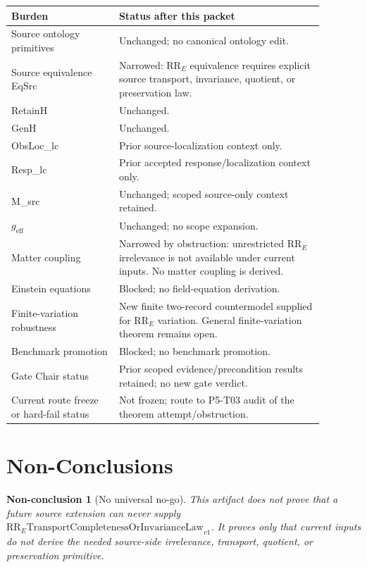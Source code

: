\documentclass[11pt]{article}
\newcommand{\RRE}{\mathrm{RR}_E}
\newcommand{\RRMissing}{\mathrm{RR}_{E}\mathrm{TransportCompletenessOrInvarianceLaw}_{v1}}
\newtheorem{nonconclusion}{Non-conclusion}
\begin{document}
\begin{longtable}{p{0.30\linewidth}p{0.58\linewidth}}
\toprule
Burden & Status after this packet \\
\midrule
Source ontology primitives & Unchanged; no canonical ontology edit. \\
Source equivalence EqSrc & Narrowed: \(\RRE\) equivalence requires explicit
source transport, invariance, quotient, or preservation law. \\
RetainH & Unchanged. \\
GenH & Unchanged. \\
ObsLoc\_lc & Prior source-localization context only. \\
Resp\_lc & Prior accepted response/localization context only. \\
M\_src & Unchanged; scoped source-only context retained. \\
\(g_{\mathrm{eff}}\) & Unchanged; no scope expansion. \\
Matter coupling & Narrowed by obstruction: unrestricted \(\RRE\) irrelevance
is not available under current inputs. No matter coupling is derived. \\
Einstein equations & Blocked; no field-equation derivation. \\
Finite-variation robustness & New finite two-record countermodel supplied for
\(\RRE\) variation. General finite-variation theorem remains open. \\
Benchmark promotion & Blocked; no benchmark promotion. \\
Gate Chair status & Prior scoped evidence/precondition results retained; no
new gate verdict. \\
Current route freeze or hard-fail status & Not frozen; route to P5-T03 audit
of the theorem attempt/obstruction. \\
\bottomrule
\end{longtable}

\section{Non-Conclusions}

\begin{nonconclusion}[No universal no-go]
This artifact does not prove that a future source extension can never supply
\(\RRMissing\). It proves only that current inputs do not derive the needed
source-side irrelevance, transport, quotient, or preservation primitive.
\end{nonconclusion}
\end{document}
